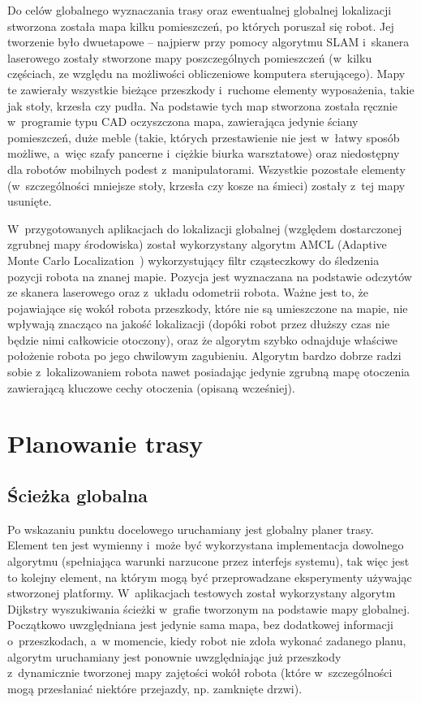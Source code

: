 Do celów globalnego wyznaczania trasy oraz ewentualnej globalnej lokalizacji stworzona
została mapa kilku pomieszczeń, po których poruszał się robot. Jej tworzenie było
dwuetapowe -- najpierw przy pomocy algorytmu SLAM i~skanera laserowego zostały
stworzone mapy poszczególnych pomieszczeń (w~kilku częściach, ze względu na możliwości
obliczeniowe komputera sterującego). Mapy te zawierały wszystkie bieżące
przeszkody i~ruchome elementy wyposażenia, takie jak stoły, krzesła czy pudła.
Na podstawie tych map stworzona została ręcznie w~programie typu CAD oczyszczona
mapa, zawierająca jedynie ściany pomieszczeń, duże meble (takie, których przestawienie
nie jest w~łatwy sposób możliwe, a~więc szafy pancerne i~ciężkie biurka warsztatowe)
oraz niedostępny dla robotów mobilnych podest z~manipulatorami. Wszystkie pozostałe
elementy (w~szczególności mniejsze stoły, krzesła czy kosze na śmieci) zostały z~tej
mapy usunięte.

W~przygotowanych aplikacjach do lokalizacji globalnej (względem dostarczonej
zgrubnej mapy środowiska) został wykorzystany algorytm AMCL (Adaptive Monte Carlo
Localization~\cite{fox2001kld}) wykorzystujący filtr cząsteczkowy do śledzenia
pozycji robota na znanej mapie. Pozycja jest wyznaczana na podstawie odczytów
ze skanera laserowego oraz z~układu odometrii robota. Ważne jest to, że pojawiające
się wokół robota przeszkody, które nie są umieszczone na mapie, nie wpływają znacząco
na jakość lokalizacji (dopóki robot przez dłuższy czas nie będzie nimi całkowicie
otoczony), oraz że algorytm szybko odnajduje właściwe położenie robota po jego
chwilowym zagubieniu. Algorytm bardzo dobrze radzi sobie z~lokalizowaniem robota nawet
posiadając jedynie zgrubną mapę otoczenia zawierającą kluczowe cechy otoczenia
(opisaną wcześniej).

\section{Planowanie trasy}

\subsection{Ścieżka globalna}

Po wskazaniu punktu docelowego uruchamiany jest globalny planer trasy. Element ten
jest wymienny i~może być wykorzystana implementacja dowolnego algorytmu (spełniająca
warunki narzucone przez interfejs systemu), tak więc jest to kolejny element, na którym
mogą być przeprowadzane eksperymenty używając stworzonej platformy. W~aplikacjach
testowych został wykorzystany algorytm Dijkstry wyszukiwania ścieżki w~grafie tworzonym
na podstawie mapy globalnej. Początkowo uwzględniana jest jedynie sama mapa, bez
dodatkowej informacji o~przeszkodach, a~w momencie, kiedy robot nie zdoła wykonać
zadanego planu, algorytm uruchamiany jest ponownie uwzględniając już przeszkody
z~dynamicznie tworzonej mapy zajętości wokół robota (które w~szczególności mogą
przesłaniać niektóre przejazdy, np. zamknięte drzwi).

